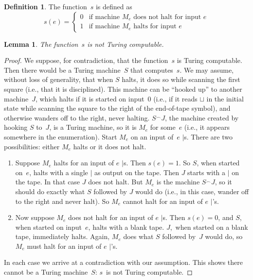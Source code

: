 \documentclass[10pt,a4paper]{article}
\theoremstyle{plain}
\newtheorem{lem}[thm]{Lemma}
\theoremstyle{definition}
\newtheorem{defn}[thm]{Definition}
\theoremstyle{remark}
\providecommand{\concat}{\mathbin{{}^\frown}}
\providecommand{\TMblank}{\sqcup}
\providecommand{\TMstroke}{\mid}
\begin{document}
\begin{defn} The function~$s$ is defined as
\[
s(e) =
\begin{cases}
  \text{0} & \text{if machine~$M_e$ does not halt for input $e$} \\
  \text{1} & \text{if machine~$M_e$ halts for input $e$}
\end{cases}
\]
\end{defn}

\begin{lem}
The function~$s$ is not Turing computable.
\end{lem}

\begin{proof}
We suppose, for contradiction, that the function~$s$ is Turing
computable.  Then there would be a Turing machine~$S$ that
computes~$s$. We may assume, without loss of generality, that when $S$
halts, it does so while scanning the first square (i.e., that it is
disciplined).  This machine can be ``hooked up'' to another
machine~$J$, which halts if it is started on input~$0$ (i.e., if it
reads $\TMblank$ in the initial state while scanning the square to the
right of the end-of-tape symbol), and otherwise wanders off to the
right, never halting. $S \concat J$, the machine created by hooking
$S$ to~$J$, is a Turing machine, so it is $M_e$ for some~$e$ (i.e., it
appears somewhere in the enumeration). Start $M_e$ on an input of~$e$
$\TMstroke$s. There are two possibilities: either $M_e$ halts or it
does not halt.
\begin{enumerate}
\item Suppose $M_e$ halts for an input of $e$ $\TMstroke$s. Then $s(e)
  = 1$. So $S$, when started on~$e$, halts with a single $\TMstroke$
  as output on the tape.  Then $J$ starts with a $\TMstroke$ on the
  tape. In that case $J$ does not halt. But $M_e$ is the machine $S
  \concat J$, so it should do exactly what $S$ followed by $J$ would
  do (i.e., in this case, wander off to the right and never halt).  So
  $M_e$ cannot halt for an input of $e$ $\TMstroke$'s.

\item Now suppose $M_e$ does not halt for an input of $e$
  $\TMstroke$s.  Then $s(e) = 0$, and $S$, when started on input~$e$,
  halts with a blank tape.  $J$,~when started on a blank tape,
  immediately halts.  Again, $M_e$ does what $S$ followed by~$J$ would
  do, so $M_e$ must halt for an input of $e$ $\TMstroke$'s.
\end{enumerate}
In each case we arrive at a contradiction with our assumption. This
shows there cannot be a Turing machine~$S$: $s$~is not Turing
computable.
\end{proof}
\end{document}
